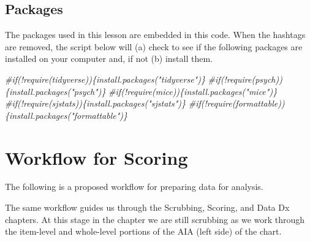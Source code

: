 \documentclass[
  11pt,
]{book}
\newenvironment{Shaded}{\begin{snugshade}}{\end{snugshade}}
\newcommand{\CommentTok}[1]{\textcolor[rgb]{0.37,0.37,0.37}{\textit{#1}}}
\begin{document}
\hypertarget{packages-1}{%
\subsection{Packages}\label{packages-1}}

The packages used in this lesson are embedded in this code. When the hashtags are removed, the script below will (a) check to see if the following packages are installed on your computer and, if not (b) install them.

\begin{Shaded}
\begin{Highlighting}[]
\CommentTok{\#if(!require(tidyverse))\{install.packages("tidyverse")\}}
\CommentTok{\#if(!require(psych))\{install.packages("psych")\}}
\CommentTok{\#if(!require(mice))\{install.packages("mice")\}}
\CommentTok{\#if(!require(sjstats))\{install.packages("sjstats")\}}
\CommentTok{\#if(!require(formattable))\{install.packages("formattable")\}}
\end{Highlighting}
\end{Shaded}

\hypertarget{workflow-for-scoring}{%
\section{Workflow for Scoring}\label{workflow-for-scoring}}

The following is a proposed workflow for preparing data for analysis.

The same workflow guides us through the Scrubbing, Scoring, and Data Dx chapters. At this stage in the chapter we are still scrubbing as we work through the item-level and whole-level portions of the AIA (left side) of the chart.
\end{document}
